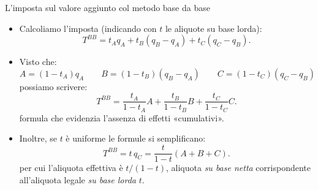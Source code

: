 \documentclass[aspectratio=64,11pt]{beamer}
\begin{document}
\begin{frame}{L'imposta sul valore aggiunto col metodo base da base}
\begin{itemize}
\item Calcoliamo l'imposta (indicando con $t$ le aliquote su base lorda):
\begin{equation*}
T^{BB} = t_Aq_A + t_B(q_B-q_A) + t_C(q_C-q_B).
\end{equation*}
\item Visto che:
\begin{equation*}
A=(1-t_A)q_A\qquad B=(1-t_B)(q_B-q_A)\qquad C=(1-t_C)(q_C-q_B)
\end{equation*}
possiamo scrivere:
\begin{equation*}
  T^{BB} = \frac{t_A}{1-t_A}A + \frac{t_B}{1-t_B}B +\frac{t_C}{1-t_C}C.
\end{equation*}
formula che evidenzia l'assenza di effetti «cumulativi».
\item Inoltre, se $t$ è uniforme le formule si semplificano:
\begin{equation*}
  T^{BB} = t\,q_C = \frac{t}{1-t}(A + B+ C).
\end{equation*}
per cui l'aliquota effettiva è $t/(1-t)$, aliquota \emph{su base netta}
corrispondente all'aliquota legale \emph{su base lorda} $t$.
\end{itemize}
\end{frame}
\end{document}
